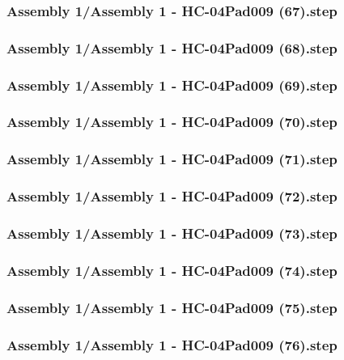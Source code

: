 \documentclass[a4paper,12pt]{article}
\begin{document}
\begin{lstlising}[language=C++]
\subsubsection{Assembly 1/Assembly 1 - HC-04Pad009 (67).step}

\subsubsection{Assembly 1/Assembly 1 - HC-04Pad009 (68).step}

\subsubsection{Assembly 1/Assembly 1 - HC-04Pad009 (69).step}

\subsubsection{Assembly 1/Assembly 1 - HC-04Pad009 (70).step}

\subsubsection{Assembly 1/Assembly 1 - HC-04Pad009 (71).step}

\subsubsection{Assembly 1/Assembly 1 - HC-04Pad009 (72).step}

\subsubsection{Assembly 1/Assembly 1 - HC-04Pad009 (73).step}

\subsubsection{Assembly 1/Assembly 1 - HC-04Pad009 (74).step}

\subsubsection{Assembly 1/Assembly 1 - HC-04Pad009 (75).step}

\subsubsection{Assembly 1/Assembly 1 - HC-04Pad009 (76).step}


\end{lstlising}
\end{document}
